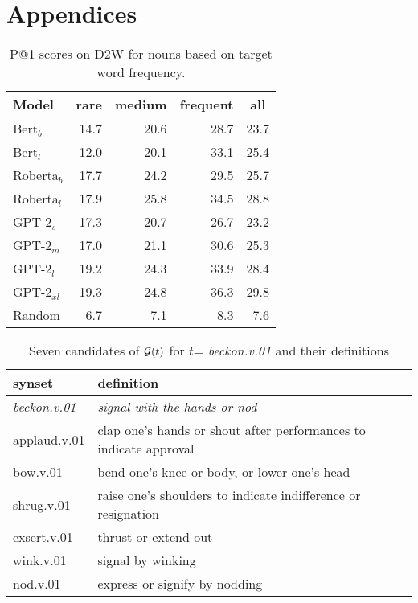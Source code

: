 \documentclass[11pt,a4paper]{article}
\begin{document}
\appendix
\section{Appendices}
\label{sec:appendix}


\begin{table}[H]
    \centering
    \begin{tabular}{l|rrrr}
    \hline
        \textbf{Model} & \multicolumn{1}{c}{\textbf{rare}} & \multicolumn{1}{c}{\textbf{medium}} & \multicolumn{1}{c}{\textbf{frequent}} & \multicolumn{1}{c}{\textbf{all}} \\ \hline
     Bert$_{b}$ & 14.7 & 20.6 & 28.7 & 23.7 \\
     Bert$_{l}$ & 12.0 & 20.1 & 33.1 & 25.4\\
     Roberta$_{b}$ & 17.7 & 24.2 & 29.5 & 25.7 \\
     Roberta$_{l}$ & 17.9 & 25.8 & 34.5 & 28.8 \\ \hline
     GPT-2$_{s}$ & 17.3 & 20.7 & 26.7 & 23.2 \\
     GPT-2$_{m}$ & 17.0 & 21.1 & 30.6 & 25.3 \\
     GPT-2$_{l}$ & 19.2 & 24.3 & 33.9 & 28.4 \\
     GPT-2$_{xl}$ & 19.3 & 24.8 & 36.3 & 29.8 \\ \hline
     Random & 6.7 & 7.1 & 8.3 & 7.6 \\ \hline 
     
    \end{tabular}
    \caption{P@1 scores on D2W for nouns based on target word frequency.}
    \label{tab:freq_results_D2W}
\end{table}

\begin{table*}
    \centering
    \begin{tabular}{l|l}
    \hline
    \textbf{synset} & \textbf{definition} \\ \hline
     \emph{beckon.v.01} & \emph{signal with the hands or nod} \\
     applaud.v.01 & clap one's hands or shout after performances to indicate approval \\
     bow.v.01 & bend one's knee or body, or lower one's head \\
     shrug.v.01 & raise one's shoulders to indicate indifference or resignation \\
     exsert.v.01 & thrust or extend out \\
     wink.v.01 & signal by winking \\
     nod.v.01 & express or signify by nodding \\\hline
   
    \end{tabular}
    \caption{Seven candidates of ${\cal G}(t)$ for $t$=  \emph{beckon.v.01} and their definitions} 
    \label{tab:dataset_samples}
\end{table*}
\end{document}
